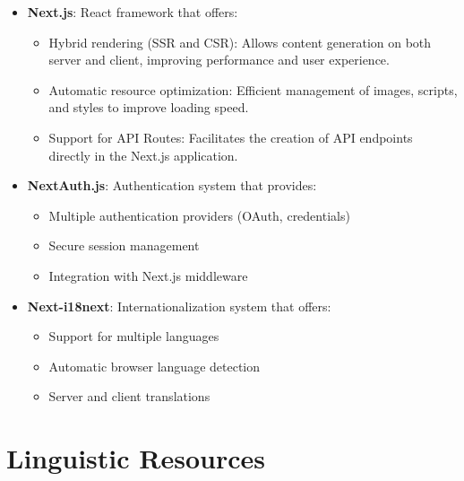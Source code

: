 \begin{itemize}
	\item \textbf{Next.js}: React framework that offers:
	      \begin{itemize}
		      \item Hybrid rendering (SSR and CSR): Allows content generation on both server and client, improving performance and user experience.
		      \item Automatic resource optimization: Efficient management of images, scripts, and styles to improve loading speed.
		      \item Support for API Routes: Facilitates the creation of API endpoints directly in the Next.js application.
	      \end{itemize}


	\item \textbf{NextAuth.js}: Authentication system that provides:
	      \begin{itemize}
		      \item Multiple authentication providers (OAuth, credentials)
		      \item Secure session management
		      \item Integration with Next.js middleware
	      \end{itemize}


	\item \textbf{Next-i18next}: Internationalization system that offers:
	      \begin{itemize}
		      \item Support for multiple languages
		      \item Automatic browser language detection
		      \item Server and client translations
	      \end{itemize}
\end{itemize}

\section{Linguistic Resources}

